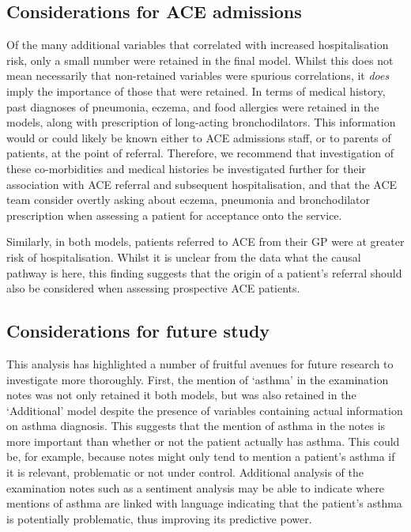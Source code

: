 \subsection{Considerations for ACE admissions}

Of the many additional variables that correlated with increased hospitalisation risk, only a small number were retained in the final model. Whilst this does not mean necessarily that non-retained variables were spurious correlations, it \textit{does} imply the importance of those that were retained. In terms of medical history, past diagnoses of pneumonia, eczema, and food allergies were retained in the models, along with prescription of long-acting bronchodilators. This information would or could likely be known either to ACE admissions staff, or to parents of patients, at the point of referral. Therefore, we recommend that investigation of these co-morbidities and medical histories be investigated further for their association with ACE referral and subsequent hospitalisation, and that the ACE team consider overtly asking about eczema, pneumonia and bronchodilator prescription when assessing a patient for acceptance onto the service.

Similarly, in both models, patients referred to ACE from their GP were at greater risk of hospitalisation. Whilst it is unclear from the data what the causal pathway is here, this finding suggests that the origin of a patient's referral should also be considered when assessing prospective ACE patients.

\subsection{Considerations for future study}

This analysis has highlighted a number of fruitful avenues for future research to investigate more thoroughly.
First, the mention of `asthma' in the examination notes was not only retained it both models, but was also retained in the `Additional' model despite the presence of variables containing actual information on asthma diagnosis. This suggests that the mention of asthma in the notes is more important than whether or not the patient actually has asthma. 
This could be, for example, because notes might only tend to mention a patient's asthma if it is relevant, problematic or not under control. Additional analysis of the examination notes such as a sentiment analysis may be able to indicate where mentions of asthma are linked with language indicating that the patient's asthma is potentially problematic, thus improving its predictive power.

